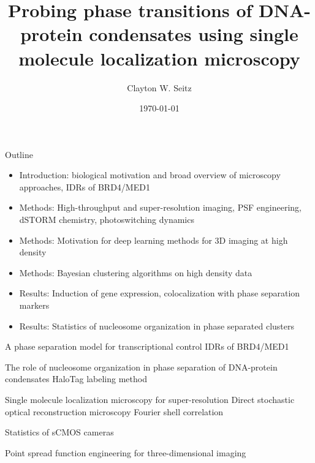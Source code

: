 \documentclass{beamer}					%
\title{Probing phase transitions of DNA-protein condensates using single molecule localization microscopy}	%
\author{Clayton W. Seitz}								%
\date{\today}									%
\begin{document}
\begin{frame}
  \titlepage
\end{frame}


%


\begin{frame}{Outline}
\begin{itemize}
\item Introduction: biological motivation and broad overview of microscopy approaches, IDRs of BRD4/MED1
\item Methods: High-throughput and super-resolution imaging, PSF engineering, dSTORM chemistry, photoswitching dynamics
\item Methods: Motivation for deep learning methods for 3D imaging at high density
\item Methods: Bayesian clustering algorithms on high density data
\item Results: Induction of gene expression, colocalization with phase separation markers
\item Results: Statistics of nucleosome organization in phase separated clusters
\end{itemize}
\end{frame}

\begin{frame}{A phase separation model for transcriptional control}
IDRs of BRD4/MED1
\end{frame}

\begin{frame}{The role of nucleosome organization in phase separation of DNA-protein condensates}
HaloTag labeling method
\end{frame}

\begin{frame}{Single molecule localization microscopy for super-resolution}
Direct stochastic optical reconstruction microscopy
Fourier shell correlation
\end{frame}


\begin{frame}{Statistics of sCMOS cameras}
\end{frame}

\begin{frame}{Point spread function engineering for three-dimensional imaging}
\end{frame}
\end{document}
